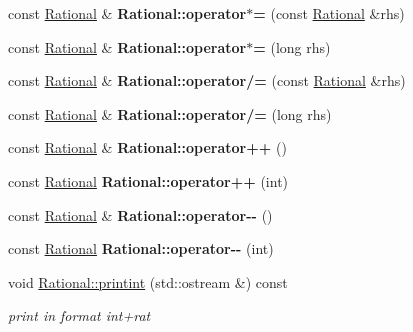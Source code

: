 \begin{DoxyCompactItemize}
\mbox{\label{group__general_ga17205b7127a763b3eaf44f6fecaac50b}} 
const \mbox{\hyperlink{classRational}{Rational}} \& {\bfseries Rational\+::operator$\ast$=} (const \mbox{\hyperlink{classRational}{Rational}} \&rhs)
\item 
\mbox{\label{group__general_gae50b290ade4698dd865cd451c3c23dda}} 
const \mbox{\hyperlink{classRational}{Rational}} \& {\bfseries Rational\+::operator$\ast$=} (long rhs)
\item 
\mbox{\label{group__general_gaa9902842b5b7724cd307b5770a75b0c7}} 
const \mbox{\hyperlink{classRational}{Rational}} \& {\bfseries Rational\+::operator/=} (const \mbox{\hyperlink{classRational}{Rational}} \&rhs)
\item 
\mbox{\label{group__general_gaa6627aa1f4524568c059b8914b2665bc}} 
const \mbox{\hyperlink{classRational}{Rational}} \& {\bfseries Rational\+::operator/=} (long rhs)
\item 
\mbox{\label{group__general_ga23e1bd04a616269e833eabf12ebb247b}} 
const \mbox{\hyperlink{classRational}{Rational}} \& {\bfseries Rational\+::operator++} ()
\item 
\mbox{\label{group__general_gace6087d7c3382a18099dda188d1e5d9c}} 
const \mbox{\hyperlink{classRational}{Rational}} {\bfseries Rational\+::operator++} (int)
\item 
\mbox{\label{group__general_ga46aa465b7b59fbdbc5abff452a713b3c}} 
const \mbox{\hyperlink{classRational}{Rational}} \& {\bfseries Rational\+::operator-\/-\/} ()
\item 
\mbox{\label{group__general_ga45c0bd14078313e6ff7be68dd612efa1}} 
const \mbox{\hyperlink{classRational}{Rational}} {\bfseries Rational\+::operator-\/-\/} (int)
\item 
\mbox{\label{group__general_ga11edcb2aed3334c33c9e962be2bda2fe}} 
void \mbox{\hyperlink{group__general_ga11edcb2aed3334c33c9e962be2bda2fe}{Rational\+::printint}} (std\+::ostream \&) const
\begin{DoxyCompactList}\small\item\em print in format int+rat \end{DoxyCompactList}\item 

\end{DoxyCompactItemize}

